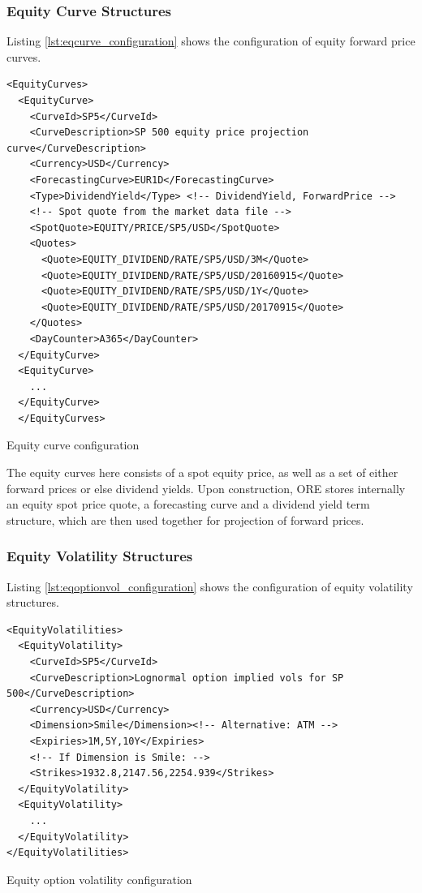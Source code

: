 \documentclass[12pt, a4paper]{article}
\newenvironment{longlisting}{\captionsetup{type=listing}}{}
\begin{document}
\subsubsection{Equity Curve Structures}

Listing \ref{lst:eqcurve_configuration} shows the configuration of equity forward price curves.

\begin{longlisting}
\begin{verbatim}
<EquityCurves>
  <EquityCurve>
    <CurveId>SP5</CurveId>
    <CurveDescription>SP 500 equity price projection curve</CurveDescription>
    <Currency>USD</Currency>
    <ForecastingCurve>EUR1D</ForecastingCurve>
    <Type>DividendYield</Type> <!-- DividendYield, ForwardPrice -->
    <!-- Spot quote from the market data file -->
    <SpotQuote>EQUITY/PRICE/SP5/USD</SpotQuote> 
    <Quotes>
      <Quote>EQUITY_DIVIDEND/RATE/SP5/USD/3M</Quote>
      <Quote>EQUITY_DIVIDEND/RATE/SP5/USD/20160915</Quote>
      <Quote>EQUITY_DIVIDEND/RATE/SP5/USD/1Y</Quote>
      <Quote>EQUITY_DIVIDEND/RATE/SP5/USD/20170915</Quote>
    </Quotes>
    <DayCounter>A365</DayCounter>
  </EquityCurve>
  <EquityCurve>
    ...
  </EquityCurve> 
  </EquityCurves>
\end{verbatim}
\caption{Equity curve configuration}
\label{lst:eqcurve_configuration}
\end{longlisting}

The equity curves here consists of a spot equity price, as well as a set of either forward prices or else dividend 
yields. Upon construction, ORE stores internally an equity spot price quote, a forecasting curve and a dividend yield 
term structure, which are then used together for projection of forward prices.

\subsubsection{Equity Volatility Structures}

Listing \ref{lst:eqoptionvol_configuration} shows the configuration of equity volatility structures.

\begin{longlisting}
\begin{verbatim}
<EquityVolatilities>
  <EquityVolatility>
    <CurveId>SP5</CurveId>
    <CurveDescription>Lognormal option implied vols for SP 500</CurveDescription>
    <Currency>USD</Currency>
    <Dimension>Smile</Dimension><!-- Alternative: ATM -->
    <Expiries>1M,5Y,10Y</Expiries>
    <!-- If Dimension is Smile: -->
    <Strikes>1932.8,2147.56,2254.939</Strikes>
  </EquityVolatility>
  <EquityVolatility>
    ...
  </EquityVolatility>
</EquityVolatilities>
\end{verbatim}
\caption{Equity option volatility configuration}
\label{lst:eqoptionvol_configuration}
\end{longlisting}
\end{document}
